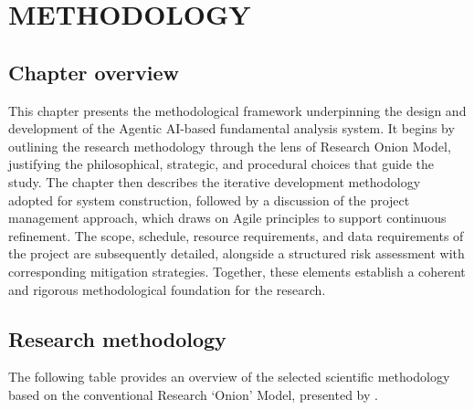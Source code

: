 \chapter{METHODOLOGY}
\section{Chapter overview}

This chapter presents the methodological framework underpinning the design and development of the Agentic AI-based fundamental analysis system. It begins by outlining the research methodology through the lens of \citep{saunders2019research} Research Onion Model, justifying the philosophical, strategic, and procedural choices that guide the study. The chapter then describes the iterative development methodology adopted for system construction, followed by a discussion of the project management approach, which draws on Agile principles to support continuous refinement. The scope, schedule, resource requirements, and data requirements of the project are subsequently detailed, alongside a structured risk assessment with corresponding mitigation strategies. Together, these elements establish a coherent and rigorous methodological foundation for the research.

\section{Research methodology}

The following table provides an overview of the selected scientific methodology based on the
conventional Research ‘Onion’ Model, presented by \citep{saunders2019research}.

